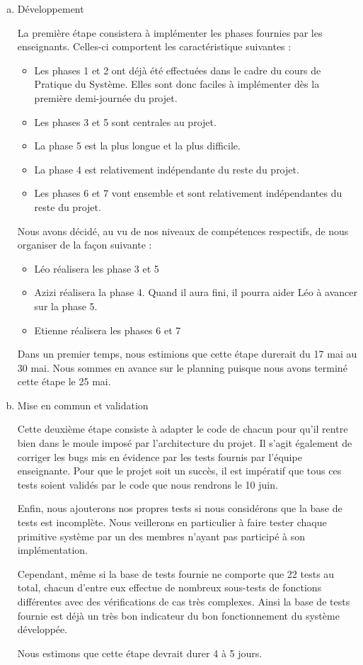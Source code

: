 \documentclass[a4paper, 11pt, titlepage]{article}
\begin{document}
\begin{enumerate}[(a)] %
\item
Développement

La première étape consistera à implémenter les phases fournies par les enseignants. Celles-ci comportent les caractéristique suivantes :

\begin{itemize}
\item
Les phases 1 et 2 ont déjà été effectuées dans le cadre du cours de Pratique du Système. Elles sont donc faciles à implémenter dès la première demi-journée du projet.
\item
Les phases 3 et 5 sont centrales au projet.
\item
La phase 5 est la plus longue et la plus difficile.
\item
La phase 4 est relativement indépendante du reste du projet.
\item
Les phases 6 et 7 vont ensemble et sont relativement indépendantes du reste du projet.
\end{itemize}
\vspace{0.3cm}
Nous avons décidé, au vu de nos niveaux de compétences respectifs, de nous organiser de la façon suivante :

\begin{itemize}
\item
Léo réalisera les phase 3 et 5
\item
Azizi réalisera la phase 4. Quand il aura fini, il pourra aider Léo à avancer sur la phase 5.
\item
Etienne réalisera les phases 6 et 7
\end{itemize}
\vspace{0.3cm}

Dans un premier temps, nous estimions que cette étape durerait du 17 mai au 30 mai. Nous sommes en avance sur le planning puisque nous avons terminé cette étape le 25 mai.

\item
Mise en commun et validation

Cette deuxième étape consiste à adapter le code de chacun pour qu'il rentre bien dans le moule imposé par l'architecture du projet. Il s'agit également de corriger les bugs mis en évidence par les tests fournis par l'équipe enseignante. Pour que le projet soit un succès, il est impératif que tous ces tests soient validés par le code que nous rendrons le 10 juin.

Enfin, nous ajouterons nos propres tests si nous considérons que la base de tests est incomplète. Nous veillerons en particulier à faire tester chaque primitive système par un des membres n'ayant pas participé à son implémentation.

Cependant, même si la base de tests fournie ne comporte que 22 tests au total, chacun d'entre eux effectue de nombreux sous-tests de fonctions différentes avec des vérifications de cas très complexes. Ainsi la base de tests fournie est déjà un très bon indicateur du bon fonctionnement du système développée.

Nous estimons que cette étape devrait durer 4 à 5 jours.
\end{enumerate}
\end{document}
